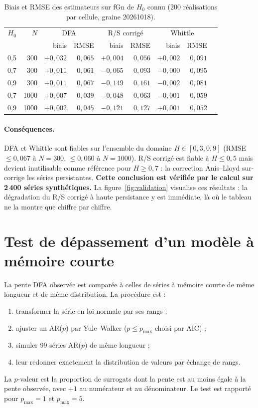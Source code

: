 \documentclass[12pt,a4paper]{report}
\theoremstyle{definition}
\begin{document}
\begin{table}[ht]
\centering
\caption{Biais et RMSE des estimateurs sur fGn de $H_0$ connu (200 réalisations par cellule, graine 20261018).}
\label{tab:exactitude}
\small
\begin{tabular}{rrrrrrrrr}
\toprule
$H_0$ & $N$ & \multicolumn{2}{c}{DFA} & \multicolumn{2}{c}{R/S corrigé} & \multicolumn{2}{c}{Whittle} \\
 & & biais & RMSE & biais & RMSE & biais & RMSE \\
\midrule
0{,}5 & 300 & $+0{,}032$ & $0{,}065$ & $+0{,}004$ & $0{,}056$ & $+0{,}002$ & $0{,}091$ \\
0{,}7 & 300 & $+0{,}011$ & $0{,}061$ & $-0{,}065$ & $0{,}093$ & $-0{,}000$ & $0{,}095$ \\
0{,}9 & 300 & $+0{,}011$ & $0{,}067$ & $-0{,}149$ & $0{,}161$ & $-0{,}002$ & $0{,}081$ \\
0{,}7 & 1000 & $+0{,}007$ & $0{,}039$ & $-0{,}048$ & $0{,}063$ & $-0{,}001$ & $0{,}059$ \\
0{,}9 & 1000 & $+0{,}002$ & $0{,}045$ & $-0{,}121$ & $0{,}127$ & $+0{,}001$ & $0{,}052$ \\
\bottomrule
\end{tabular}
\end{table}

\paragraph{Conséquences.} DFA et Whittle sont fiables sur l'ensemble du domaine
$H \in [0{,}3, 0{,}9]$ (RMSE $\le 0{,}067$ à $N=300$, $\le 0{,}060$ à $N=1000$). R/S
corrigé est fiable à $H \le 0{,}5$ mais devient inutilisable comme référence pour
$H \ge 0{,}7$ : la correction Anis--Lloyd sur-corrige les séries persistantes.
\textbf{Cette conclusion est vérifiée par le calcul sur 2\,400 séries synthétiques.}
La figure~\ref{fig:validation} visualise ces résultats : la dégradation du R/S corrigé
à haute persistance y est immédiate, là où le tableau ne la montre que chiffre par
chiffre.

\section{Test de dépassement d'un modèle à mémoire courte}
\label{sec:nul}

La pente DFA observée est comparée à celles de séries à mémoire courte de même longueur
et de même distribution. La procédure est :
\begin{enumerate}
  \item transformer la série en loi normale par ses rangs ;
  \item ajuster un AR($p$) par Yule--Walker ($p\le p_{\max}$ choisi par AIC) ;
  \item simuler 99 séries AR($p$) de même longueur ;
  \item leur redonner exactement la distribution de valeurs par échange de rangs.
\end{enumerate}
La $p$-valeur est la proportion de surrogats dont la pente est au moins égale à la pente
observée, avec $+1$ au numérateur et au dénominateur. Le test est rapporté pour
$p_{\max}=1$ et $p_{\max}=5$.
\end{document}
